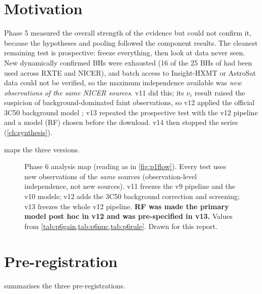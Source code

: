 \section{Motivation}
Phase 5 measured the overall strength of the evidence but could not confirm it, because the hypotheses and pooling followed
the component results. The cleanest remaining test is prospective: freeze everything, then look at data never seen. New
dynamically confirmed BHs were exhausted (16 of the 25 BHs of \citet{Marcel2026} had been used across RXTE and NICER), and batch
access to Insight-HXMT or AstroSat data could not be verified, so the maximum independence available was \emph{new observations
of the same NICER sources}. v11 did this; its $\nu_c$ result raised the suspicion of background-dominated faint observations, so
v12 applied the official 3C50 background model \citep{Remillard2022}; v13 repeated the prospective test with the v12 pipeline and a
model (RF) chosen before the download. v14 then stopped the series (\cref{ch:synthesis}).

 maps the three versions.

\begin{figure}[htbp]
\centering

\caption[Phase 6 analysis map]{Phase 6 analysis map (reading as in \cref{fig:p1flow}). Every test uses new observations of the
\emph{same} sources (observation-level independence, not new sources). v11 freezes the v9 pipeline and the v10 models; v12 adds
the 3C50 background correction and screening; v13 freezes the whole v12 pipeline. \textbf{RF was made the primary model post hoc
in v12 and was pre-specified in v13.} Values from \cref{tab:p6gain,tab:p6nuc,tab:p6rule}. Drawn for this report.}
\label{fig:p6flow}
\end{figure}

\section{Pre-registration}
 summarises the three pre-registrations.

